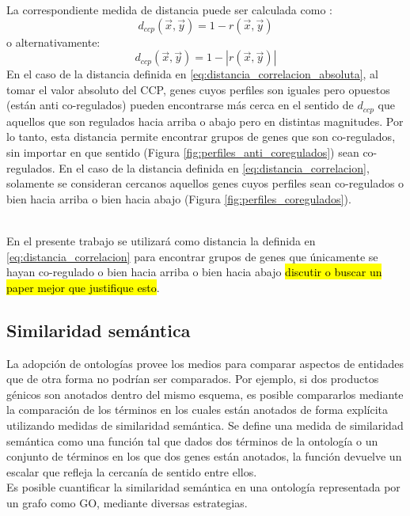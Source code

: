 La correspondiente medida de distancia puede ser calculada como \cite{Dhaeseleer2005}:
\begin{equation}
	d_{ccp}(\vec{x}, \vec{y}) = 1-r(\vec{x}, \vec{y})
	\label{eq:distancia_correlacion}
\end{equation}
o alternativamente:
\begin{equation}
	d_{ccp}(\vec{x}, \vec{y}) = 1-|r(\vec{x}, \vec{y})|
	\label{eq:distancia_correlacion_absoluta}
\end{equation}
En el caso de la distancia definida en \ref{eq:distancia_correlacion_absoluta}, al tomar el valor absoluto del CCP, genes cuyos perfiles son iguales pero opuestos (están anti co-regulados) pueden encontrarse más cerca en el sentido de $d_{ccp}$ que aquellos que son regulados hacia arriba o abajo pero en distintas magnitudes. Por lo tanto, esta distancia permite encontrar grupos de genes que son co-regulados, sin importar en que sentido (Figura \ref{fig:perfiles_anti_coregulados}) sean co-regulados.
En el caso de la distancia definida en \ref{eq:distancia_correlacion}, solamente se consideran cercanos aquellos genes cuyos perfiles sean co-regulados o bien hacia arriba o bien hacia abajo (Figura \ref{fig:perfiles_coregulados}).
\begin{figure}[h]

\end{figure}
\cite{Hennig2013}\cite{Kheng2010}\cite{Babu2004}\cite{Gan2007}\\
En el presente trabajo se utilizará como distancia la definida en \ref{eq:distancia_correlacion} para encontrar grupos de genes que únicamente se hayan co-regulado o bien hacia arriba o bien hacia abajo \cite{Eisen1998} \hl{discutir o buscar un paper mejor que justifique esto}.
\clearpage
\subsection{Similaridad semántica}
La adopción de ontologías provee los medios para comparar aspectos de entidades que de otra forma no podrían ser comparados. Por ejemplo, si dos productos génicos son anotados dentro del mismo esquema, es posible compararlos mediante la comparación de los términos en los cuales están anotados de forma explícita utilizando medidas de similaridad semántica. Se define una medida de similaridad semántica como una función tal que dados dos términos de la ontología o un conjunto de términos en los que dos genes están anotados, la función devuelve un escalar que refleja la cercanía de sentido entre ellos.\\
Es posible cuantificar la similaridad semántica en una ontología representada por un grafo como GO, mediante diversas estrategias.
